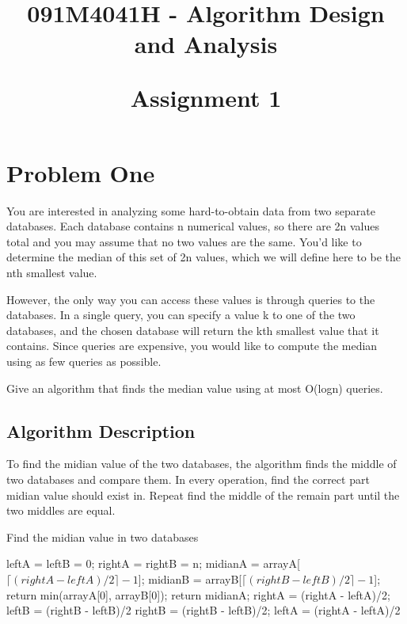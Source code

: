 \documentclass{article}
\begin{document}

\title{091M4041H - Algorithm Design and Analysis\\ [2ex] \begin{large} Assignment 1 \end{large}}


\maketitle

\tableofcontents

\newpage
\section{Problem One}

You are interested in analyzing some hard-to-obtain data from two separate databases. Each database contains n numerical values, so there are 2n values total and you may assume that no two values are the same. You'd like to determine the median of this set of 2n values, which we will define here to be the nth smallest value.

However, the only way you can access these values is through queries to the databases. In a single query, you can specify a value k to one of the two databases, and the chosen database will return the kth smallest value that it contains. Since queries are expensive, you would like to compute the median using as few queries as possible.

Give an algorithm that finds the median value using at most O(logn) queries.

\subsection{Algorithm Description}

To find the midian value of the two databases, the algorithm finds the middle of two databases and compare them. In every operation, find the correct part midian value should exist in. Repeat find the middle of the remain part until the two middles are equal.  

\begin{algorithm}[htbp]  
  \caption{Find the midian value in two databases}  
  \begin{algorithmic}[1] 
	\State leftA = leftB = 0;
	\State rightA = rightB = n; 
      \State midianA = arrayA[$\lceil  (rightA - leftA)/2 \rceil -1$];  
      \State midianB = arrayB[$\lceil  (rightB - leftB)/2 \rceil -1$]; 
	 \State return min(arrayA[0], arrayB[0]); 
      \EndIf
	 \State return midianA; 
      \EndIf 
	 \State rightA = (rightA - leftA)/2;
	 \State leftB = (rightB - leftB)/2
	\Else 
	 \State rightB = (rightB - leftB)/2;
	 \State leftA = (rightA - leftA)/2
      \EndIf 
	\EndWhile
    \EndFunction 
  \end{algorithmic}  
\end{algorithm} 
\end{document}
